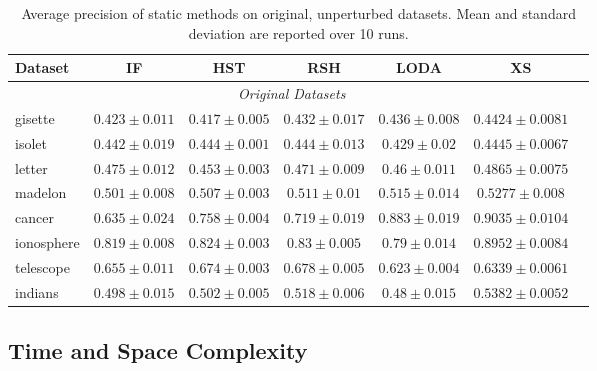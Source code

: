 \begin{footnotesize}
\begin{table}[!hbtp]
		\begin{tabular}{lcccccc}
		\toprule
		\textbf{Dataset} & \textbf{IF} &  \textbf{HST} & \textbf{RSH} &  \textbf{LODA}  & \textbf{XS}\\
		\midrule
				\multicolumn{6}{c}{\textit{Original Datasets}}\\
		gisette& $0.423 \pm 0.011$ &  $0.417 \pm 0.005$ &  $0.432 \pm 0.017$ &  $0.436 \pm 0.008$ &  $0.4424 \pm 0.0081$    \\
		isolet& $0.442 \pm 0.019$ &  $0.444 \pm 0.001$ &  $0.444 \pm 0.013$ &  $0.429 \pm 0.02$ &  $0.4445 \pm 0.0067$    \\
		letter& $0.475 \pm 0.012$ &  $0.453 \pm 0.003$ &  $0.471 \pm 0.009$ &  $0.46 \pm 0.011$ &  $0.4865 \pm 0.0075$    \\
		madelon& $0.501 \pm 0.008$ &  $0.507 \pm 0.003$ &  $0.511 \pm 0.01$ &  $0.515 \pm 0.014$ &  $0.5277 \pm 0.008$    \\
		cancer& $0.635 \pm 0.024$ &  $0.758 \pm 0.004$ &  $0.719 \pm 0.019$ &  $0.883 \pm 0.019$ &  $0.9035 \pm 0.0104$    \\
		ionosphere& $0.819 \pm 0.008$ &  $0.824 \pm 0.003$ &  $0.83 \pm 0.005$ &  $0.79 \pm 0.014$ &  $0.8952 \pm 0.0084$    \\
		telescope& $0.655 \pm 0.011$ &  $0.674 \pm 0.003$ &  $0.678 \pm 0.005$ &  $0.623 \pm 0.004$ &  $0.6339 \pm 0.0061$    \\
		indians& $0.498 \pm 0.015$ &  $0.502 \pm 0.005$ &  $0.518 \pm 0.006$ &  $0.48 \pm 0.015$ &  $0.5382 \pm 0.0052$    \\
		\bottomrule
		\end{tabular}
		\caption{Average precision of static methods on original, unperturbed datasets. Mean and standard deviation are reported over 10 runs.}
\end{table}
\end{footnotesize}

\subsection{Time and Space Complexity}
%
%


